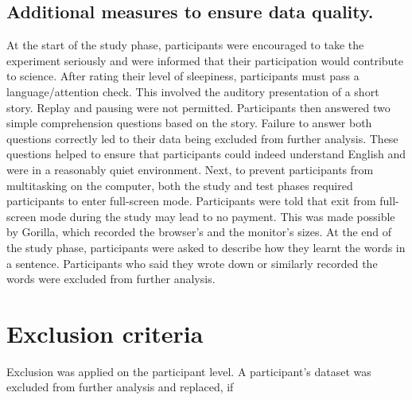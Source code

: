 \documentclass[
]{article}
\begin{document}
\hypertarget{additional-measures-to-ensure-data-quality.}{%
\subsection{Additional measures to ensure data quality.}\label{additional-measures-to-ensure-data-quality.}}

At the start of the study phase, participants were encouraged to take the experiment seriously and were informed that their participation would contribute to science. After rating their level of sleepiness, participants must pass a language/attention check. This involved the auditory presentation of a short story. Replay and pausing were not permitted. Participants then answered two simple comprehension questions based on the story. Failure to answer both questions correctly led to their data being excluded from further analysis. These questions helped to ensure that participants could indeed understand English and were in a reasonably quiet environment. Next, to prevent participants from multitasking on the computer, both the study and test phases required participants to enter full-screen mode. Participants were told that exit from full-screen mode during the study may lead to no payment. This was made possible by Gorilla, which recorded the browser's and the monitor's sizes. At the end of the study phase, participants were asked to describe how they learnt the words in a sentence. Participants who said they wrote down or similarly recorded the words were excluded from further analysis.

\hypertarget{exclusion-criteria}{%
\section{Exclusion criteria}\label{exclusion-criteria}}

Exclusion was applied on the participant level. A participant's dataset was excluded from further analysis and replaced, if
\end{document}
